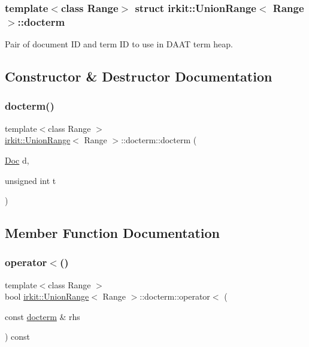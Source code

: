 \subsubsection*{template$<$class Range$>$\newline
struct irkit\+::\+Union\+Range$<$ Range $>$\+::docterm}

Pair of document ID and term ID to use in D\+A\+AT term heap. 

\subsection{Constructor \& Destructor Documentation}
\mbox{\label{structirkit_1_1UnionRange_1_1docterm_a5a45bee16d82935e804cf2a0a492a3c5}} 
\subsubsection{\texorpdfstring{docterm()}{docterm()}}
{\footnotesize\ttfamily template$<$class Range $>$ \\
\hyperlink{classirkit_1_1UnionRange}{irkit\+::\+Union\+Range}$<$ Range $>$\+::docterm\+::docterm (\begin{DoxyParamCaption}\item[{\hyperlink{classirkit_1_1UnionRange_a387589b1f09868b60485c4ab8c61f97a}{Doc}}]{d,  }\item[{unsigned int}]{t }\end{DoxyParamCaption})\hspace{0.3cm}{\ttfamily [inline]}}



\subsection{Member Function Documentation}
\mbox{\label{structirkit_1_1UnionRange_1_1docterm_a5f4842c5758933c11d28a00aa5a66262}} 
\subsubsection{\texorpdfstring{operator$<$()}{operator<()}}
{\footnotesize\ttfamily template$<$class Range $>$ \\
bool \hyperlink{classirkit_1_1UnionRange}{irkit\+::\+Union\+Range}$<$ Range $>$\+::docterm\+::operator$<$ (\begin{DoxyParamCaption}\item[{const \hyperlink{structirkit_1_1UnionRange_1_1docterm}{docterm} \&}]{rhs }\end{DoxyParamCaption}) const\hspace{0.3cm}{\ttfamily [inline]}}

